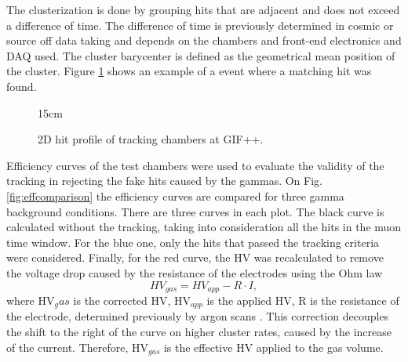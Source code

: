 The clusterization is done by grouping hits that are adjacent and does not exceed a difference of time. The difference of time is previously determined in cosmic or source off data taking and depends on the chambers and front-end electronics and DAQ used. The cluster barycenter is defined as the geometrical mean position of the cluster. Figure \ref{fig:tracking_evt} shows an example of a event where a matching hit was found.

\begin{figure}[!htm]{15cm}
\caption{2D hit profile of tracking chambers at GIF++.}%
\label{fig:tracking_evt}
\end{figure}

Efficiency curves of the test chambers were used to evaluate the validity of the tracking in rejecting the fake hits caused by the gammas. On Fig. \ref{fig:effcomparison} the efficiency curves are compared for three gamma background conditions. There are three curves in each plot. The black curve is calculated without the tracking, taking into consideration all the hits in the muon time window. For the blue one, only the hits that passed the tracking criteria were considered. Finally, for the red curve, the HV was recalculated to remove the voltage drop caused by the resistance of the electrodes using the Ohm law
\begin{equation}
    HV_{gas} = HV_{app} - R \cdot I,
\end{equation}
where HV$_gas$ is the corrected HV, HV$_{app}$ is the applied HV, R is the resistance of the electrode, determined previously by argon scans \cite{peskov2018resistive}. This correction decouples the shift to the right of the curve on higher cluster rates, caused by the increase of the current. Therefore, HV$_{gas}$ is the effective HV applied to the gas volume. 


